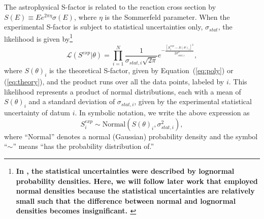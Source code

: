 \documentclass[twocolumn]{aastex63}
\begin{document}
The astrophysical S-factor is related to the reaction cross section by $S(E) \equiv E e^{2 \pi \eta} \sigma(E)$, where $\eta$ is the Sommerfeld parameter. When the experimental S-factor is subject to statistical uncertainties only, $\sigma_{stat}$, the likelihood is given by\footnote{\bf{
In \citet{iliadis16,gomez17}, the statistical uncertainties were described by lognormal probability densities. Here, we will follow later work \citep{deSouza:2019gf,deSouza:2019gi,de_Souza_2020} that employed normal densities because the statistical uncertainties are relatively small such that the difference between normal and lognormal densities becomes insignificant.
}
}
%
\begin{equation}
\label{eq:likelihood} 
    \mathcal{L}(S^{exp}|\theta)=\prod_{i=1}^N \frac{1}{\sigma_{stat,i}\sqrt{2\pi}}
    e^{-\frac{[S_i^{exp} - S(\theta)_i]^2}{2\sigma^2_{stat,i}}},
\end{equation}
%
where $S(\theta)_i$ is the theoretical S-factor, given by Equation~(\ref{eq:poly}) or (\ref{eq:theory}), and the product runs over all the data points, labeled by $i$. This likelihood represents a product of normal distributions, each with a mean of $S(\theta)_i$ and a standard deviation of $\sigma_{stat,i}$, given by the experimental statistical uncertainty of datum $i$. In symbolic notation, we write the above expression as
%
\begin{equation}
\label{eq:Si}
S_i^{exp} \sim \mathrm{Normal}(S(\theta)_i,\sigma^2_{stat,i}),
\end{equation}
%
where ``$\mathrm{Normal}$'' denotes a normal (Gaussian) probability density and the symbol ``$\sim$'' means ``has the probability distribution of.''
\end{document}
